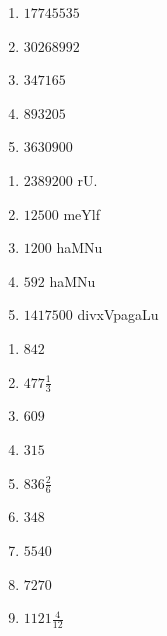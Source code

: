 
\begin{multicols}{3}
\begin{enumerate}[$(1)$]
\item $17745535$
\item $30268992$ 
\item $347165$
\item $893205$
\item $3630900$
\end{enumerate}
\end{multicols}

\begin{multicols}{3}
\begin{enumerate}[$(1)$]
\item $2389200$ rU.
\item $12500$ meYlf
\item $1200$ haMNu
\item $592$ haMNu
\item $1417500$ divxVpagaLu
\end{enumerate}
\end{multicols}

\begin{multicols}{5}
\begin{enumerate}[$(1)$]
\item $842$ 
\item $477 \frac{1}{3}$ 
\item $609$  
\item $315$  
\item $836 \frac{2}{6}$ 
\item $348$  
\item $5540$ 
\item $7270$
\item $1121 \frac{4}{12}$
\end{enumerate}
\end{multicols}


